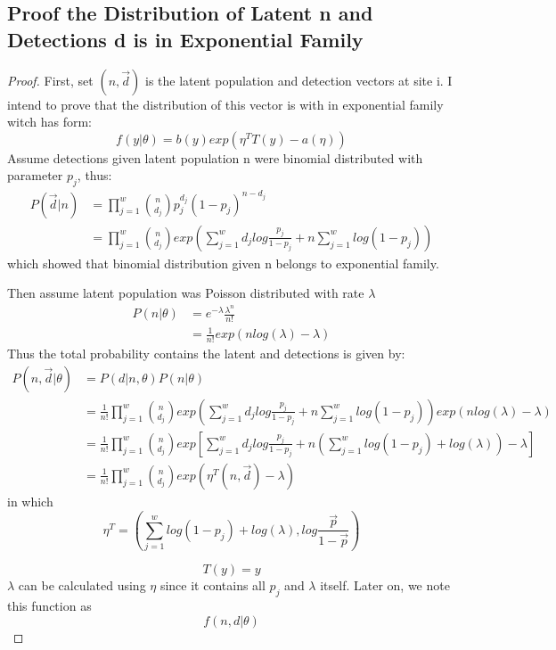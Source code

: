 \documentclass[]{article}
\begin{document}
\subsection{Proof the Distribution of Latent n and Detections d is in Exponential Family}
\begin{proof}
First, set $(n,\vec{d})$ is the latent population and detection vectors at site i. I intend to prove that the distribution of this vector is with in exponential family witch has form:
\begin{equation}
	f(y|\theta)=b(y)exp(\eta^{T}T(y)-a(\eta))
\end{equation}
Assume detections given latent population n were binomial distributed with parameter $p_{j}$, thus:
\begin{equation}
	\begin{aligned}
		P(\vec{d}|n)&=\prod_{j=1}^{w}\binom{n}{d_{j}}p_{j}^{d_{j}}(1-p_{j})^{n-d_{j}}\\
		&=\prod_{j=1}^{w}\binom{n}{d_{j}}exp(\sum_{j=1}^{w}d_{j}log\frac{p_{j}}{1-p_{j}}+n\sum_{j=1}^{w}log(1-p_{j}))
	\end{aligned}
\end{equation}
which showed that binomial distribution given n belongs to exponential family.

Then assume latent population was Poisson distributed with rate $\lambda$
\begin{equation}
	\begin{aligned}
		P(n|\theta)&=e^{-\lambda}\frac{\lambda^{n}}{n!}\\
		&=\frac{1}{n!}exp(nlog(\lambda)-\lambda)
	\end{aligned}
\end{equation}
Thus the total probability contains the latent and detections is given by:
\begin{equation}
	\begin{aligned}
		P(n,\vec{d}|\theta)&=P(d|n,\theta)P(n|\theta)\\
		&=\frac{1}{n!}\prod_{j=1}^{w}\binom{n}{d_{j}}exp(\sum_{j=1}^{w}d_{j}log\frac{p_{j}}{1-p_{j}}+n\sum_{j=1}^{w}log(1-p_{j}))exp(nlog(\lambda)-\lambda)\\
		&=\frac{1}{n!}\prod_{j=1}^{w}\binom{n}{d_{j}}exp[\sum_{j=1}^{w}d_{j}log\frac{p_{j}}{1-p_{j}}+n(\sum_{j=1}^{w}log(1-p_{j})+log(\lambda))-\lambda]\\
		&=\frac{1}{n!}\prod_{j=1}^{w}\binom{n}{d_{j}}exp(\eta^{T}(n,\vec{d})-\lambda)
	\end{aligned}
\end{equation}
in which 
\[
\eta^{T}=(\sum_{j=1}^{w}log(1-p_{j})+log(\lambda),log\frac{\vec{p}}{1-\vec{p}})
\]

\[
T(y)=y
\]
$\lambda$ can be calculated using $\eta$ since it contains all $p_{j}$ and $\lambda$ itself.
Later on, we note this function as
\[
f(n,d|\theta)
\]
\end{proof}
\end{document}

